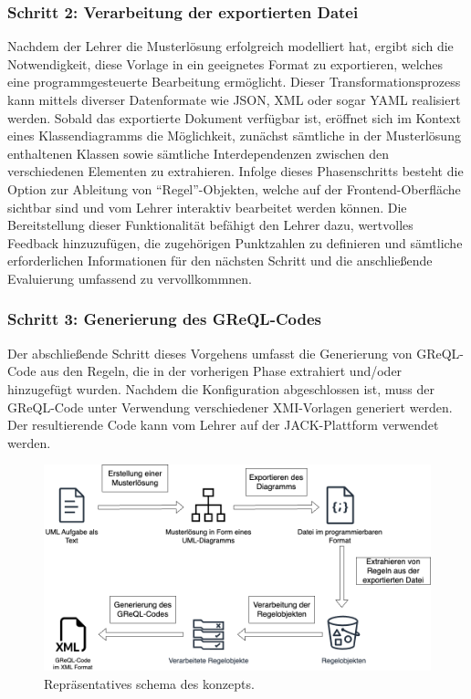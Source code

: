\subsubsection{Schritt 2: Verarbeitung der exportierten Datei}

Nachdem der Lehrer die Musterlösung erfolgreich modelliert hat, ergibt sich die Notwendigkeit, diese Vorlage in ein geeignetes Format zu exportieren, welches eine programmgesteuerte Bearbeitung ermöglicht. Dieser Transformationsprozess kann mittels diverser Datenformate wie JSON, XML oder sogar YAML realisiert werden. Sobald das exportierte Dokument verfügbar ist, eröffnet sich im Kontext eines Klassendiagramms die Möglichkeit, zunächst sämtliche in der Musterlösung enthaltenen Klassen sowie sämtliche Interdependenzen zwischen den verschiedenen Elementen zu extrahieren. Infolge dieses Phasenschritts besteht die Option zur Ableitung von ``Regel''-Objekten, welche auf der Frontend-Oberfläche sichtbar sind und vom Lehrer interaktiv bearbeitet werden können. Die Bereitstellung dieser Funktionalität befähigt den Lehrer dazu, wertvolles Feedback hinzuzufügen, die zugehörigen Punktzahlen zu definieren und sämtliche erforderlichen Informationen für den nächsten Schritt und die anschließende Evaluierung umfassend zu vervollkommnen.

\subsubsection{Schritt 3: Generierung des GReQL-Codes}

Der abschließende Schritt dieses Vorgehens umfasst die Generierung von GReQL-Code aus den Regeln, die in der vorherigen Phase extrahiert und/oder hinzugefügt wurden. Nachdem die Konfiguration abgeschlossen ist, muss der GReQL-Code unter Verwendung verschiedener XMI-Vorlagen generiert werden. Der resultierende Code kann vom Lehrer auf der JACK-Plattform verwendet werden.

\begin{figure}
	\centering
	\includegraphics[width=15cm]{images/concept.png}
	\caption{Repräsentatives schema des konzepts.}
	\label{fig:concept}
\end{figure}

